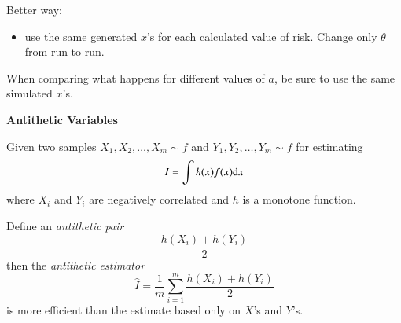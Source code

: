 \documentclass[11pt,english]{scrbook}
\begin{document}
Better way:
\begin{itemize}
\item use the same generated \(x\)'s for each calculated value of risk.  Change only \(\theta\) from run to run.
\end{itemize}

When comparing what happens for different values of \(a\), be sure to use the same simulated \(x\)'s.



\textbf{Antithetic Variables}

Given two samples \(X_{1},X_{2},\ldots,X_{m}\sim f\)  and  \(Y_{1},Y_{2},\ldots,Y_{m}\sim f\) for estimating 
\[
I = \int h(x) f(x) \mathrm{d} x
\] 
where \(X_{i}\) and \(Y_{i}\) are negatively correlated and \(h\) is a monotone function.

Define an \emph{antithetic pair}
\[
\frac{h(X_{i}) + h(Y_{i})}{2}
\]
then the \emph{antithetic estimator}
\[
\hat{I}=\frac{1}{m} \sum_{i = 1}^{m}\frac{h(X_{i}) + h(Y_{i})}{2}
\]
is more efficient than the estimate based only on \(X\)'s and \(Y\)'s.
\end{document}
